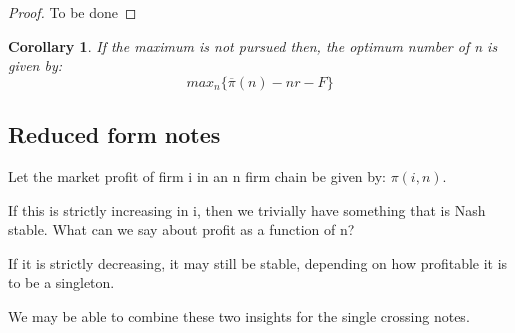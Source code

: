 \documentclass{article}
\newtheorem{corollary}{Corollary}
\begin{document}
\begin{proof}
To be done
\end{proof}


\begin{corollary}
If the maximum is not pursued then, the optimum number of n is given by:
\begin{equation*}
max_n\{\overline{\pi}(n)-n r-F  \}
\end{equation*}
\end{corollary}

\subsection{Reduced form notes}

Let the market profit of firm i in an n firm chain be given by: $\pi(i,n)$. 

If this is strictly increasing in i, then we trivially have something that is Nash stable. What can we say about profit as a function of n? 

If it is strictly decreasing, it may still be stable, depending on how profitable it is to be a singleton. 

We may be able to combine these two insights for the single crossing notes. 


\end{document}
